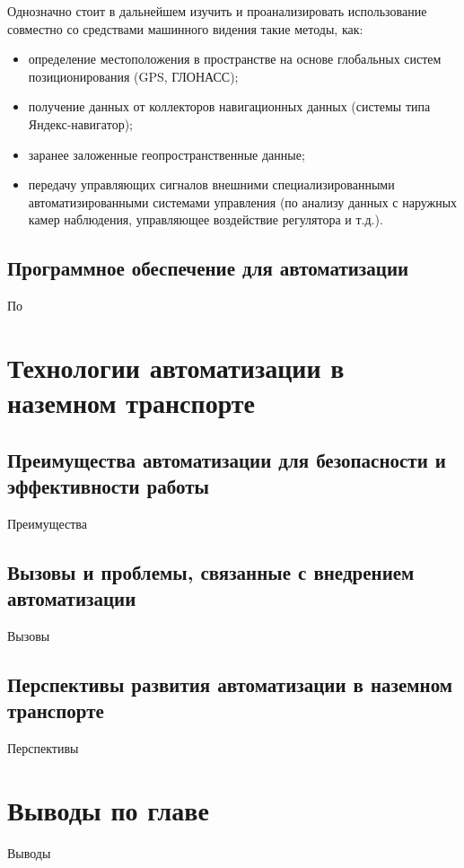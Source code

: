 Однозначно стоит в дальнейшем изучить и проанализировать использование совместно со средствами машинного видения такие методы, как:

\begin{itemize}
    \item определение местоположения в пространстве на основе глобальных систем позиционирования (GPS, ГЛОНАСС);
    \item получение данных от коллекторов навигационных данных (системы типа Яндекс-навигатор);
    \item заранее заложенные геопространственные данные;
    \item передачу управляющих сигналов внешними специализированными автоматизированными системами управления (по анализу данных с наружных камер наблюдения, управляющее воздействие регулятора и т.д.).
\end{itemize}


\subsection{Программное обеспечение для автоматизации}\label{subsec:ch1/sec2/sub3}

По

\section{Технологии автоматизации в наземном транспорте}\label{sec:ch1/sec3}

\subsection{Преимущества автоматизации для безопасности и эффективности работы}\label{subsec:ch1/sec3/sub1}

Преимущества

\subsection{Вызовы и проблемы, связанные с внедрением автоматизации}\label{subsec:ch1/sec3/sub2}

Вызовы

\subsection{Перспективы развития автоматизации в наземном транспорте}\label{subsec:ch1/sec3/sub3}

Перспективы

\section{Выводы по главе}\label{sec:ch1/sec4}

Выводы

\FloatBarrier
